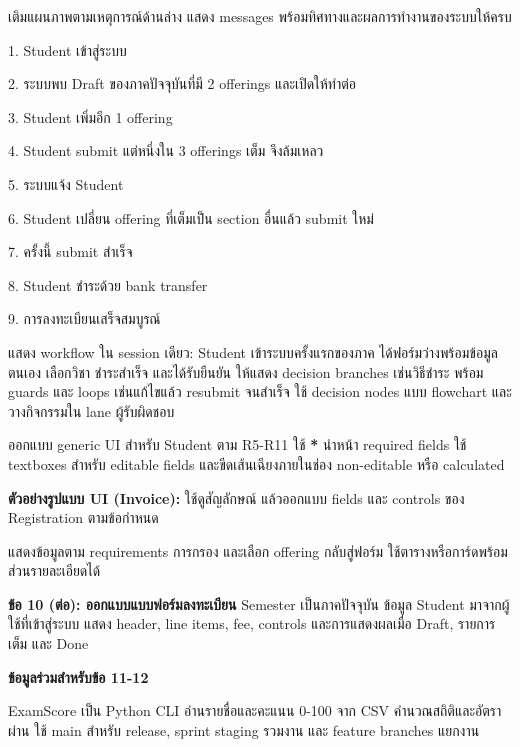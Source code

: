 เติมแผนภาพตามเหตุการณ์ด้านล่าง แสดง messages พร้อมทิศทางและผลการทำงานของระบบให้ครบ\par
\begingroup\setlength{\parskip}{0pt}
1. Student เข้าสู่ระบบ\par 2. ระบบพบ Draft ของภาคปัจจุบันที่มี 2 offerings และเปิดให้ทำต่อ\par 3. Student เพิ่มอีก 1 offering\par 4. Student submit แต่หนึ่งใน 3 offerings เต็ม จึงล้มเหลว\par 5. ระบบแจ้ง Student\par 6. Student เปลี่ยน offering ที่เต็มเป็น section อื่นแล้ว submit ใหม่\par 7. ครั้งนี้ submit สำเร็จ\par 8. Student ชำระด้วย bank transfer\par 9. การลงทะเบียนเสร็จสมบูรณ์\par
\endgroup
\begin{center}\end{center}
\newpage
{}

แสดง workflow ใน session เดียว: Student เข้าระบบครั้งแรกของภาค ได้ฟอร์มว่างพร้อมข้อมูลตนเอง เลือกวิชา ชำระสำเร็จ และได้รับยืนยัน ให้แสดง decision branches เช่นวิธีชำระ พร้อม guards และ loops เช่นแก้ไขแล้ว resubmit จนสำเร็จ ใช้ decision nodes แบบ flowchart และวางกิจกรรมใน lane ผู้รับผิดชอบ\par
\registrationActivitySkeleton
\newpage
{}

ออกแบบ generic UI สำหรับ Student ตาม R5-R11 ใช้ \textbf{*} นำหน้า required fields ใช้ textboxes สำหรับ editable fields และขีดเส้นเฉียงภายในช่อง non-editable หรือ calculated\par
\textbf{ตัวอย่างรูปแบบ UI (Invoice):} ใช้ดูสัญลักษณ์ แล้วออกแบบ fields และ controls ของ Registration ตามข้อกำหนด\par
\uiReferenceExample
{}
แสดงข้อมูลตาม requirements การกรอง และเลือก offering กลับสู่ฟอร์ม ใช้ตารางหรือการ์ดพร้อมส่วนรายละเอียดได้\par
\blankbox{14cm}
\newpage
\textbf{ข้อ 10 (ต่อ): ออกแบบแบบฟอร์มลงทะเบียน}
Semester เป็นภาคปัจจุบัน ข้อมูล Student มาจากผู้ใช้ที่เข้าสู่ระบบ แสดง header, line items, fee, controls และการแสดงผลเมื่อ Draft, รายการเต็ม และ Done\par
\blankbox{21.5cm}
\newpage
\textbf{ข้อมูลร่วมสำหรับข้อ 11-12}\par
ExamScore เป็น Python CLI อ่านรายชื่อและคะแนน 0-100 จาก CSV คำนวณสถิติและอัตราผ่าน ใช้ main สำหรับ release, sprint staging รวมงาน และ feature branches แยกงาน\par

